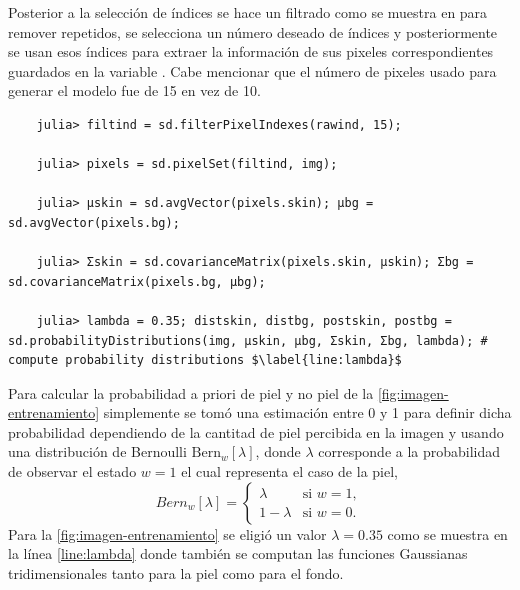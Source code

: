 Posterior a la selección de índices se hace un filtrado como se muestra en  para remover repetidos, se selecciona un número deseado de índices y posteriormente se usan esos índices para extraer la información de sus pixeles correspondientes guardados en la variable . Cabe mencionar que el número de pixeles usado para generar el modelo fue de 15 en vez de 10.
\begin{verbatim}
    julia> filtind = sd.filterPixelIndexes(rawind, 15);

    julia> pixels = sd.pixelSet(filtind, img);

    julia> μskin = sd.avgVector(pixels.skin); μbg = sd.avgVector(pixels.bg);

    julia> Σskin = sd.covarianceMatrix(pixels.skin, μskin); Σbg = sd.covarianceMatrix(pixels.bg, μbg);

    julia> lambda = 0.35; distskin, distbg, postskin, postbg = sd.probabilityDistributions(img, μskin, μbg, Σskin, Σbg, lambda); # compute probability distributions $\label{line:lambda}$
\end{verbatim}

Para calcular la probabilidad a priori de piel y no piel de la \cref{fig:imagen-entrenamiento} simplemente se tomó una estimación entre 0 y 1 para definir dicha probabilidad dependiendo de la cantitad de piel percibida en la imagen y usando una distribución de Bernoulli $\text{Bern}_{w}[\lambda]$, donde $\lambda$ corresponde a la probabilidad de observar el estado $w = 1$ el cual representa el caso de la piel,
\begin{equation*}
    Bern_{w}[\lambda] = 
    \begin{cases}
        \lambda & \text{si } w = 1 ,\\
        1 - \lambda & \text{si } w = 0 .
    \end{cases}
\end{equation*}
Para la \cref{fig:imagen-entrenamiento} se eligió un valor $\lambda = 0.35$ como se muestra en la línea \ref{line:lambda} donde también se computan las funciones Gaussianas tridimensionales tanto para la piel como para el fondo.

